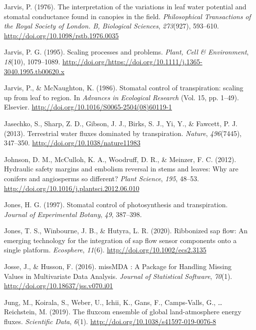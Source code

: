 \documentclass[11pt,twoside]{reedthesis}
\begin{document}
\hypertarget{ref-jarvis_interpretation_1976}{}
Jarvis, P. (1976). The interpretation of the variations in leaf water
potential and stomatal conductance found in canopies in the field.
\emph{Philosophical Transactions of the Royal Society of London. B,
Biological Sciences}, \emph{273}(927), 593--610.
\url{http://doi.org/10.1098/rstb.1976.0035}

\hypertarget{ref-Jarvis1995}{}
Jarvis, P. G. (1995). Scaling processes and problems. \emph{Plant, Cell
\& Environment}, \emph{18}(10), 1079--1089.
\url{http://doi.org/https://doi.org/10.1111/j.1365-3040.1995.tb00620.x}

\hypertarget{ref-jarvis_stomatal_1986}{}
Jarvis, P., \& McNaughton, K. (1986). Stomatal control of transpiration:
scaling up from leaf to region. In \emph{Advances in Ecological
Research} (Vol. 15, pp. 1--49). Elsevier.
\url{http://doi.org/10.1016/S0065-2504(08)60119-1}

\hypertarget{ref-Jasechko2013}{}
Jasechko, S., Sharp, Z. D., Gibson, J. J., Birks, S. J., Yi, Y., \&
Fawcett, P. J. (2013). Terrestrial water fluxes dominated by
transpiration. \emph{Nature}, \emph{496}(7445), 347--350.
\url{http://doi.org/10.1038/nature11983}

\hypertarget{ref-johnson_hydraulic_2012}{}
Johnson, D. M., McCulloh, K. A., Woodruff, D. R., \& Meinzer, F. C.
(2012). Hydraulic safety margins and embolism reversal in stems and
leaves: Why are conifers and angiosperms so different? \emph{Plant
Science}, \emph{195}, 48--53.
\url{http://doi.org/10.1016/j.plantsci.2012.06.010}

\hypertarget{ref-Jones1997}{}
Jones, H. G. (1997). Stomatal control of photosynthesis and
transpiration. \emph{Journal of Experimental Botany}, \emph{49},
387--398.

\hypertarget{ref-jones_ribbonized_2020}{}
Jones, T. S., Winbourne, J. B., \& Hutyra, L. R. (2020). Ribbonized sap
flow: An emerging technology for the integration of sap flow sensor
components onto a single platform. \emph{Ecosphere}, \emph{11}(6).
\url{http://doi.org/10.1002/ecs2.3135}

\hypertarget{ref-josse_missmda_2016}{}
Josse, J., \& Husson, F. (2016). missMDA : A Package for Handling
Missing Values in Multivariate Data Analysis. \emph{Journal of
Statistical Software}, \emph{70}(1).
\url{http://doi.org/10.18637/jss.v070.i01}

\hypertarget{ref-Jung2019}{}
Jung, M., Koirala, S., Weber, U., Ichii, K., Gans, F., Camps-Valls, G.,
\ldots{} Reichstein, M. (2019). The fluxcom ensemble of global
land-atmosphere energy fluxes. \emph{Scientific Data}, \emph{6}(1).
\url{http://doi.org/10.1038/s41597-019-0076-8}
\end{document}
